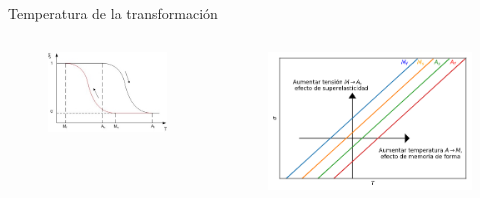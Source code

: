 \documentclass[11pt]{beamer}
\begin{document}
		\begin{frame}{Temperatura de la transformación}
			\begin{columns}[T]
				\begin{column}{.49\textwidth}
					\begin{figure}
						\includegraphics[scale=0.5]{img/Sma_wire.jpeg}
					\end{figure}
				\end{column}
				\begin{column}{.49\textwidth}
					\begin{figure}
						\includegraphics[scale=0.25]{img/TvsStress.png}
					\end{figure}
				\end{column}
			\end{columns}
		\end{frame}
		
\end{document}
